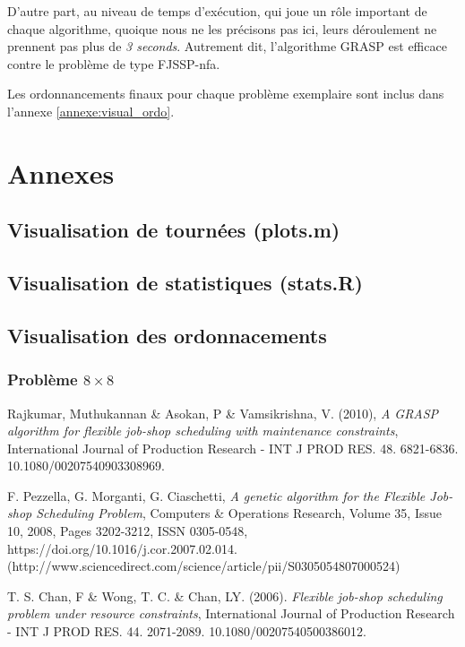 \documentclass[10pt,a4paper]{scrartcl}
\begin{document}
D'autre part, au niveau de temps d'exécution, qui joue un rôle important de chaque algorithme, quoique nous ne les précisons pas ici, leurs déroulement ne prennent pas plus de \emph{3 seconds}. Autrement dit, l'algorithme GRASP est efficace contre le problème de type FJSSP-nfa.

Les ordonnancements finaux pour chaque problème exemplaire sont inclus dans l'annexe \eqref{annexe:visual_ordo}.

\section{Annexes}

\subsection{Visualisation de tournées (plots.m)}

%

\subsection{Visualisation de statistiques (stats.R)}
%

\subsection{Visualisation des ordonnacements}
\subsubsection{Problème $8 \times 8$}

\label{annexe:visual_ordo}
\begin{thebibliography}{1}
   Rajkumar, Muthukannan \& Asokan, P \& Vamsikrishna, V. (2010),
   \emph{A GRASP algorithm for flexible job-shop scheduling with maintenance constraints},
    International Journal of Production Research - INT J PROD RES. 48. 6821-6836. 10.1080/00207540903308969. 

	F. Pezzella, G. Morganti, G. Ciaschetti,
	\emph{A genetic algorithm for the Flexible Job-shop Scheduling Problem},
	Computers \& Operations Research,
	Volume 35, Issue 10,
	2008,
	Pages 3202-3212,
	ISSN 0305-0548,
	https://doi.org/10.1016/j.cor.2007.02.014.
	(http://www.sciencedirect.com/science/article/pii/S0305054807000524)
	
	T. S. Chan, F \& Wong, T. C. \& Chan, LY. (2006). 
	\emph{Flexible job-shop scheduling problem under resource constraints}, 
	International Journal of Production Research - INT J PROD RES. 44. 2071-2089. 10.1080/00207540500386012. 
\end{thebibliography}
\end{document}

